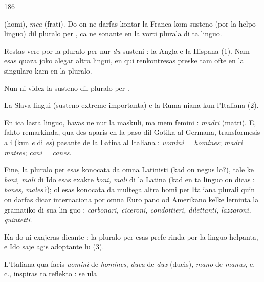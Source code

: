 \begin{VUpage}[190]{186}
\VUasterismo{48.68mm}

\VUcontinue
(homi), \textit{mea} (frati). Do on ne darfas kontar la Franca kom\nl
susteno (por la helpo-linguo) dil pluralo per , ca  ne\nl
sonante en la vorti plurala di ta linguo.

Restas vere por la pluralo per  nur \textit{du} susteni : la Angla\nl
e la Hispana (1). Nam esas quaza joko alegar altra lingui,\nl
en qui  renkontresas preske tam ofte en la singularo kam\nl
en la pluralo.

\VUsaut{6.99mm}
Nun ni videz la susteno dil pluralo per .

La Slava lingui (susteno extreme importanta) e la Ruma\cc
niana kun l'Italiana (2).

En ica lasta linguo,  havas ne nur la maskuli, ma mem\nl
femini : \textit{madri} (matri). E, fakto remarkinda,  qua des\cc
aparis en la paso dil Gotika al Germana, transformesis\nl
a i (kun \textit{e} di \textit{es}) pasante de la Latina al Italiana : \textit{uomini}\nl
= \textit{homines}; \textit{madri} = \textit{matres}; \textit{cani} = \textit{canes}.

Fine, la pluralo per  esas konocata da omna Latinisti\nl
(kad on negus lo?), tale ke \textit{boni, mali} di Ido esas exakte\nl
\textit{boni, mali} di la Latina (kad en ta linguo on dicas : \textit{bones,}\nl
\textit{males?}); ol esas konocata da multega altra homi per Italiana\nl
plurali quin on darfas dicar internaciona por omna Euro\cc
pano od Amerikano kelke lerninta la gramatiko di sua lin\cc
guo : \textit{carbonari, ciceroni, condottieri, dilettanti, lazzaroni,}\nl
\textit{quintetti}.

Ka do ni exajeras dicante : la pluralo per  esas prefe\cc
rinda por la linguo helpanta, e Ido saje agis adoptante lu (3).\parplein

L'Italiana qua facis \textit{uomini} de \textit{homines}, \textit{duca} de \textit{dux}\nl
(ducis), \textit{mano} de \textit{manus}, e. c., inspiras ta reflekto : se ula\nl
\end{VUpage}

